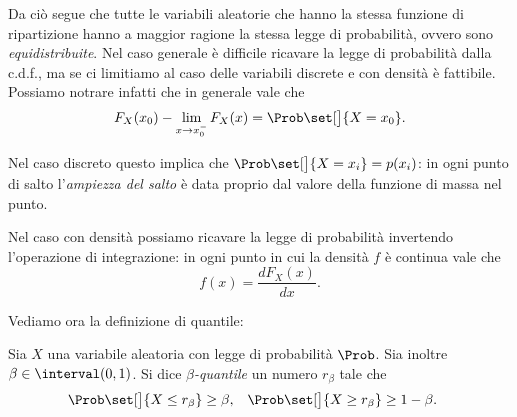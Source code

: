Da ciò segue che tutte le variabili aleatorie che hanno la stessa funzione di ripartizione hanno a maggior ragione la stessa legge di probabilità, ovvero sono \emph{equidistribuite}. Nel caso generale è difficile ricavare la legge di probabilità dalla c.d.f., ma se ci limitiamo al caso delle variabili discrete e con densità è fattibile. Possiamo notrare infatti che in generale vale che \[
    F_X(x_0) - \lim_{x \to x_0^-} F_X(x) = \Prob\set[\big]{X = x_0}.    
\]

Nel caso discreto questo implica che $\Prob\set[\big]{X = x_i} = p(x_i)$: in ogni punto di salto l'\emph{ampiezza del salto} è data proprio dal valore della funzione di massa nel punto.

Nel caso con densità possiamo ricavare la legge di probabilità invertendo l'operazione di integrazione: in ogni punto in cui la densità $f$ è continua vale che \[
    f(x) = \frac{dF_X(x)}{dx}.    
\]

Vediamo ora la definizione di quantile:
\begin{definition}
    [Quantile]
    Sia $X$ una variabile aleatoria con legge di probabilità $\Prob$. Sia inoltre $\beta \in \interval({0, 1})$. Si dice \emph{$\beta$-quantile} un numero $r_\beta$ tale che \begin{align*}
        \Prob\set[\big]{X \leq r_\beta} \geq \beta,\quad &\Prob\set[\big]{X \geq r_\beta} \geq 1 - \beta.   
    \end{align*}
\end{definition}

